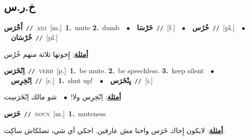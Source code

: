 \documentclass[10pt,a4paper,twoside]{article} %
\begin{document}
\begin{multicols}{2}
\vspace{-3mm}
\subsection*{\color{blue}\foreignlanguage{arabic}{خ.ر.س}\color{blue}{}} 

{\setlength\topsep{0pt}\textbf{\foreignlanguage{arabic}{أَخْرَس}}\ {\color{gray}\texttt{//}\color{black}}\ \textsc{adj}\ [m.]\ \textbf{1.}~mute  \textbf{2.}~dumb\ \ $\bullet$\ \ \setlength\topsep{0pt}\textbf{\foreignlanguage{arabic}{خَرْسَا}}\ {\color{gray}\texttt{//}\color{black}}\ [f.]\ \ $\bullet$\ \ \setlength\topsep{0pt}\textbf{\foreignlanguage{arabic}{خُرُس}}\ {\color{gray}\texttt{//}\color{black}}\ [pl.]\ \ $\bullet$\ \ \setlength\topsep{0pt}\textbf{\foreignlanguage{arabic}{خُرْسَان}}\ {\color{gray}\texttt{//}\color{black}}\ [pl.]\  \begin{flushright}\color{gray}\foreignlanguage{arabic}{\textbf{\underline{\foreignlanguage{arabic}{أمثلة}}}: إِخوتها ثلاثة منهم خُرُس}\end{flushright}\color{black}} \vspace{2mm}

{\setlength\topsep{0pt}\textbf{\foreignlanguage{arabic}{اِنْخَرَس}}\ {\color{gray}\texttt{//}\color{black}}\ \textsc{verb}\ [p.]\ \textbf{1.}~be mute.  \textbf{2.}~be speechless.  \textbf{3.}~keep silent\ \ $\bullet$\ \ \setlength\topsep{0pt}\textbf{\foreignlanguage{arabic}{اِنْخِرِس}}\ {\color{gray}\texttt{//}\color{black}}\ [c.]\ \textbf{1.}~shut up!\ \ $\bullet$\ \ \setlength\topsep{0pt}\textbf{\foreignlanguage{arabic}{يِنْخَرَس}}\ {\color{gray}\texttt{//}\color{black}}\ [i.]\  \begin{flushright}\color{gray}\foreignlanguage{arabic}{\textbf{\underline{\foreignlanguage{arabic}{أمثلة}}}: اِنْخِرِس ولا!\ $\bullet$\ \  شو مالك اِنْخَرَسِت}\end{flushright}\color{black}} \vspace{2mm}

{\setlength\topsep{0pt}\textbf{\foreignlanguage{arabic}{خَرَس}}\ {\color{gray}\texttt{//}\color{black}}\ \textsc{noun}\ [m.]\ \textbf{1.}~muteness\  \begin{flushright}\color{gray}\foreignlanguage{arabic}{\textbf{\underline{\foreignlanguage{arabic}{أمثلة}}}: لايكون إِجاك خَرَس واحنا مش عارفين. احكي أي شي، تضلكاش ساكِت.}\end{flushright}\color{black}} \vspace{2mm}


\end{multicols}
\end{document}
